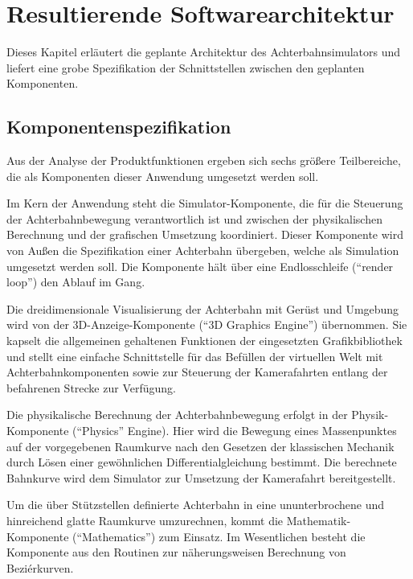 \chapter{Resultierende Softwarearchitektur}

Dieses Kapitel erläutert die geplante Architektur des Achterbahnsimulators und
liefert eine grobe Spezifikation der Schnittstellen zwischen den geplanten
Komponenten.

\section{Komponentenspezifikation}

Aus der Analyse der Produktfunktionen ergeben sich sechs größere Teilbereiche,
die als Komponenten dieser Anwendung umgesetzt werden soll.

Im Kern der Anwendung steht die Simulator-Komponente, die für die Steuerung der
Achterbahnbewegung verantwortlich ist und zwischen der physikalischen Berechnung
und der grafischen Umsetzung koordiniert. Dieser Komponente wird von Außen die
Spezifikation einer Achterbahn übergeben, welche als Simulation umgesetzt werden
soll. Die Komponente hält über eine Endlosschleife (``render loop'') den Ablauf im Gang.

Die dreidimensionale Visualisierung der Achterbahn mit Gerüst und Umgebung wird
von der 3D-Anzeige-Komponente (``3D Graphics Engine'') übernommen. Sie kapselt die allgemeinen gehaltenen
Funktionen der eingesetzten Grafikbibliothek und stellt eine einfache Schnittstelle
für das Befüllen der virtuellen Welt mit Achterbahnkomponenten sowie zur Steuerung
der Kamerafahrten entlang der befahrenen Strecke zur Verfügung.

Die physikalische Berechnung der Achterbahnbewegung erfolgt in der Physik-Komponente
(``Physics'' Engine). Hier wird die Bewegung eines Massenpunktes auf der vorgegebenen Raumkurve
nach den Gesetzen der klassischen Mechanik durch Lösen einer gewöhnlichen 
Differentialgleichung bestimmt. Die berechnete Bahnkurve wird dem Simulator zur
Umsetzung der Kamerafahrt bereitgestellt.

Um die über Stützstellen definierte Achterbahn in eine ununterbrochene und hinreichend
glatte Raumkurve umzurechnen, kommt die Mathematik-Komponente (``Mathematics'') zum Einsatz. Im
Wesentlichen besteht die Komponente aus den Routinen zur näherungsweisen Berechnung
von Beziérkurven. 

